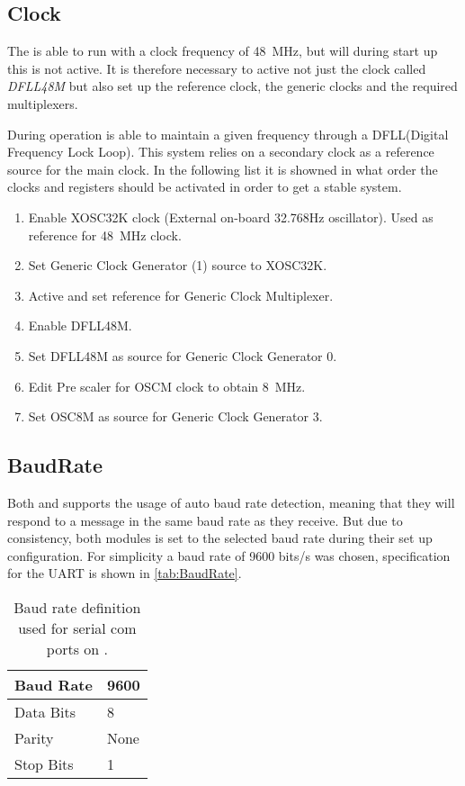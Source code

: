 \subsection{Clock}
The \SAMD is able to run with a clock frequency of \SI{48}{\mega\hertz}, but will during start up this is not active. It is therefore necessary to active not just the clock called \textit{DFLL48M} but also set up the reference clock, the generic clocks and the required multiplexers.\newline


During operation \SAMD is able to maintain a given frequency through a DFLL(Digital Frequency Lock Loop). This system relies on a secondary clock as a reference source for the main clock. In the following list it is showned in what order the clocks and registers should be activated in order to get a stable system.

\begin{enumerate}
	\item Enable XOSC32K clock (External on-board 32.768Hz oscillator). Used as reference for \SI{48}{\mega\hertz} clock.
	\item Set Generic Clock Generator (1) source to XOSC32K.
	\item Active and set reference for Generic Clock Multiplexer.
	\item Enable DFLL48M.
	\item Set DFLL48M as source for Generic Clock Generator 0.
	\item Edit Pre scaler for OSCM clock to obtain \SI{8}{\mega\hertz}.
	\item Set OSC8M as source for Generic Clock Generator 3.
\end{enumerate} 

\subsection{BaudRate}
Both \SARA and \GPS supports the usage of auto baud rate detection, meaning that they will respond to a message in the same baud rate as they receive. But due to consistency, both modules is set to the selected baud rate during their set up configuration. 
For simplicity a baud rate of 9600 bits/s was chosen, specification for the UART is shown in \vref{tab:BaudRate}.
\begin{table}[H]
	\begin{tabular}{ll}
		\hline 
		Baud Rate & 9600 \\ 
		\hline 
		Data Bits & 8 \\ 
		\hline 
		Parity & None \\ 
		\hline 
		Stop Bits & 1 \\ 
		\hline 
	\end{tabular}
	\centering
	\caption{Baud rate definition used for serial com ports on \SAMD.}
	\label{tab:BaudRate}
\end{table} 

\FloatBarrier